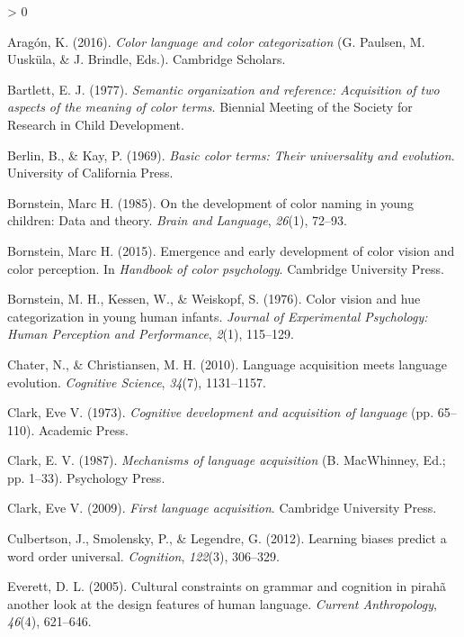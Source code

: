 \documentclass[
  english,
  ,apa7,floatsintext]{apa6}
\newlength{\cslhangindent}
\newenvironment{CSLReferences}[2] %
 {%
  \setlength{\parindent}{0pt}
  \ifodd #1 \everypar{\setlength{\hangindent}{\cslhangindent}}\ignorespaces\fi
  \ifnum #2 > 0
  \setlength{\parskip}{#2\baselineskip}
  \fi
 }%
 {}
\begin{document}
\hypertarget{refs}{}
\begin{CSLReferences}{1}{0}
\leavevmode\hypertarget{ref-aragon2016}{}%
Aragón, K. (2016). \emph{Color language and color categorization} (G. Paulsen, M. Uusküla, \& J. Brindle, Eds.). Cambridge Scholars.

\leavevmode\hypertarget{ref-bartlett1977}{}%
Bartlett, E. J. (1977). \emph{Semantic organization and reference: Acquisition of two aspects of the meaning of color terms}. Biennial Meeting of the Society for Research in Child Development.

\leavevmode\hypertarget{ref-berlin1969}{}%
Berlin, B., \& Kay, P. (1969). \emph{Basic color terms: Their universality and evolution}. University of California Press.

\leavevmode\hypertarget{ref-bornstein1985}{}%
Bornstein, Marc H. (1985). On the development of color naming in young children: Data and theory. \emph{Brain and Language}, \emph{26}(1), 72--93.

\leavevmode\hypertarget{ref-bornstein2015}{}%
Bornstein, Marc H. (2015). Emergence and early development of color vision and color perception. In \emph{Handbook of color psychology}. Cambridge University Press.

\leavevmode\hypertarget{ref-bornstein1976}{}%
Bornstein, M. H., Kessen, W., \& Weiskopf, S. (1976). Color vision and hue categorization in young human infants. \emph{Journal of Experimental Psychology: Human Perception and Performance}, \emph{2}(1), 115--129.

\leavevmode\hypertarget{ref-chater2010}{}%
Chater, N., \& Christiansen, M. H. (2010). Language acquisition meets language evolution. \emph{Cognitive Science}, \emph{34}(7), 1131--1157.

\leavevmode\hypertarget{ref-clark1973}{}%
Clark, Eve V. (1973). \emph{Cognitive development and acquisition of language} (pp. 65--110). Academic Press.

\leavevmode\hypertarget{ref-clark1987}{}%
Clark, E. V. (1987). \emph{Mechanisms of language acquisition} (B. MacWhinney, Ed.; pp. 1--33). Psychology Press.

\leavevmode\hypertarget{ref-clark2009}{}%
Clark, Eve V. (2009). \emph{First language acquisition}. Cambridge University Press.

\leavevmode\hypertarget{ref-culbertson2012}{}%
Culbertson, J., Smolensky, P., \& Legendre, G. (2012). Learning biases predict a word order universal. \emph{Cognition}, \emph{122}(3), 306--329.

\leavevmode\hypertarget{ref-everett2005}{}%
Everett, D. L. (2005). Cultural constraints on grammar and cognition in pirah{ã} another look at the design features of human language. \emph{Current Anthropology}, \emph{46}(4), 621--646.


\end{CSLReferences}
\end{document}
